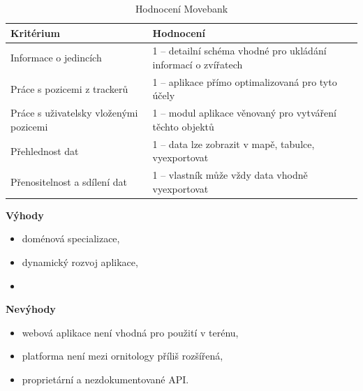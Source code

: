 \begin{table}[h]
	\begin{tabular}{ | l | l | }
		\hline			
		Kritérium                              & Hodnocení \\
		\hline			
		Informace o jedincích                  & 1 -- detailní schéma vhodné pro ukládání informací o zvířatech          \\
		Práce s pozicemi z trackerů            & 1 -- aplikace přímo optimalizovaná pro tyto účely          \\
		Práce s uživatelsky vloženými pozicemi & 1 -- modul aplikace věnovaný pro vytváření těchto objektů          \\
		Přehlednost dat                        & 1 -- data lze zobrazit v mapě, tabulce, vyexportovat          \\
		Přenositelnost a sdílení dat           & 1 -- vlastník může vždy data vhodně vyexportovat          \\
		\hline	
	\end{tabular}
	\caption{Hodnocení Movebank}
\end{table}

\textbf{Výhody}

\begin{itemize}
	\item doménová specializace,
	\item dynamický rozvoj aplikace,
	\item 
\end{itemize}

\textbf{Nevýhody}

\begin{itemize}
	\item webová aplikace není vhodná pro použití v terénu,
	\item platforma není mezi ornitology příliš rozšířená,
	\item proprietární a nezdokumentované API.
\end{itemize}


